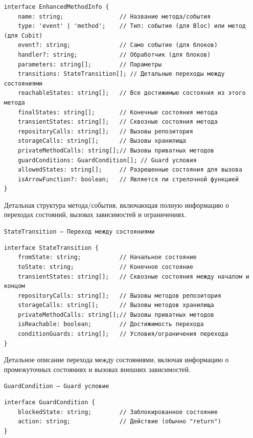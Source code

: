 \documentclass[14pt, russian]{scrartcl}
\begin{document}
\begin{verbatim}
interface EnhancedMethodInfo {
    name: string;                // Название метода/события
    type: 'event' | 'method';    // Тип: событие (для Bloc) или метод (для Cubit)
    event?: string;              // Само событие (для блоков)
    handler?: string;            // Обработчик (для блоков)
    parameters: string[];        // Параметры
    transitions: StateTransition[]; // Детальные переходы между состояниями
    reachableStates: string[];   // Все достижимые состояния из этого метода
    finalStates: string[];       // Конечные состояния метода
    transientStates: string[];   // Сквозные состояния метода
    repositoryCalls: string[];   // Вызовы репозитория
    storageCalls: string[];      // Вызовы хранилища
    privateMethodCalls: string[];// Вызовы приватных методов
    guardConditions: GuardCondition[]; // Guard условия
    allowedStates: string[];     // Разрешенные состояния для вызова
    isArrowFunction?: boolean;   // Является ли стрелочной функцией
}
\end{verbatim}

Детальная структура метода/события, включающая полную информацию о переходах состояний, вызовах зависимостей и ограничениях.

\texttt{StateTransition — Переход между состояниями}

\begin{verbatim}
interface StateTransition {
    fromState: string;           // Начальное состояние
    toState: string;             // Конечное состояние
    transientStates: string[];   // Сквозные состояния между началом и концом
    repositoryCalls: string[];   // Вызовы методов репозитория
    storageCalls: string[];      // Вызовы методов хранилища
    privateMethodCalls: string[];// Вызовы приватных методов
    isReachable: boolean;        // Достижимость перехода
    conditionGuards: string[];   // Условия/ограничения перехода
}
\end{verbatim}

Детальное описание перехода между состояниями, включая информацию о промежуточных состояниях и вызовах внешних зависимостей.

\texttt{GuardCondition — Guard условие}

\begin{verbatim}
interface GuardCondition {
    blockedState: string;        // Заблокированное состояние
    action: string;              // Действие (обычно "return")
}
\end{verbatim}
\end{document}
